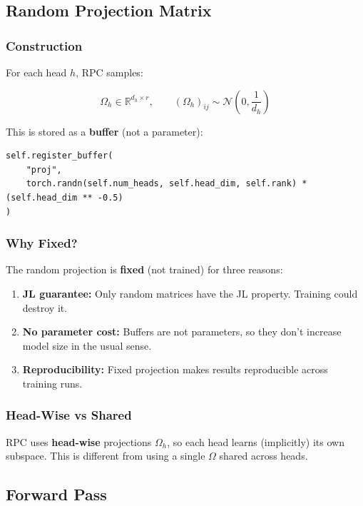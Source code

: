 \subsection{Random Projection Matrix}

\subsubsection{Construction}

For each head $h$, RPC samples:

\[
\Omega_h \in \mathbb{R}^{d_h \times r}, \qquad
(\Omega_h)_{ij} \sim \mathcal{N}\!\left(0, \frac{1}{d_h}\right)
\tag{4.1}
\]

This is stored as a \textbf{buffer} (not a parameter):

\begin{lstlisting}
self.register_buffer(
    "proj",
    torch.randn(self.num_heads, self.head_dim, self.rank) * (self.head_dim ** -0.5)
)
\end{lstlisting}

\subsubsection{Why Fixed?}

The random projection is \textbf{fixed} (not trained) for three reasons:

\begin{enumerate}
\item \textbf{JL guarantee:} Only random matrices have the JL property. Training
  could destroy it.
\item \textbf{No parameter cost:} Buffers are not parameters, so they don't increase
  model size in the usual sense.
\item \textbf{Reproducibility:} Fixed projection makes results reproducible across
  training runs.

\end{enumerate}
\subsubsection{Head-Wise vs Shared}

RPC uses \textbf{head-wise} projections $\Omega_h$, so each head learns (implicitly) 
its own subspace. This is different from using a single $\Omega$ shared 
across heads.

\subsection{Forward Pass}

